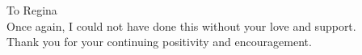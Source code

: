 


\begin{center}
	To Regina\\
	\bigskip
	Once again, I could not have done this without your love and support.\\
	Thank you for your continuing positivity and encouragement.\\
\end{center}

\restoregeometry